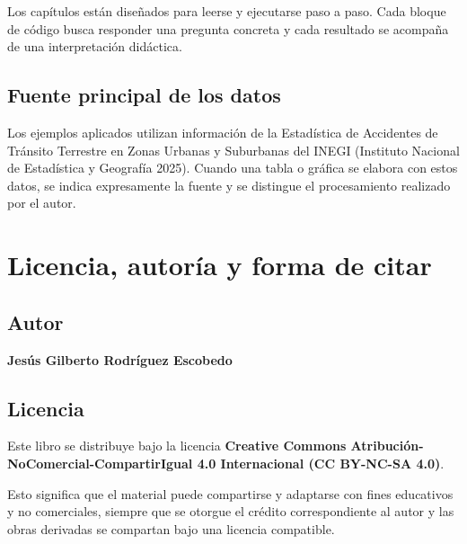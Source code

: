 \documentclass[
  spanish,
  10.5pt,
  letterpaper,
  openany,
  headings=big]{scrbook}
\begin{document}

Los capítulos están diseñados para leerse y ejecutarse paso a paso. Cada
bloque de código busca responder una pregunta concreta y cada resultado
se acompaña de una interpretación didáctica.

\section*{Fuente principal de los
datos}\label{fuente-principal-de-los-datos}


Los ejemplos aplicados utilizan información de la Estadística de
Accidentes de Tránsito Terrestre en Zonas Urbanas y Suburbanas del INEGI
(Instituto Nacional de Estadística y Geografía 2025). Cuando una tabla o
gráfica se elabora con estos datos, se indica expresamente la fuente y
se distingue el procesamiento realizado por el autor.


\chapter*{Licencia, autoría y forma de
citar}\label{licencia-autoruxeda-y-forma-de-citar}


\section*{Autor}\label{autor}


\textbf{Jesús Gilberto Rodríguez Escobedo}

\section*{Licencia}\label{licencia}


Este libro se distribuye bajo la licencia \textbf{Creative Commons
Atribución-NoComercial-CompartirIgual 4.0 Internacional (CC BY-NC-SA
4.0)}.

Esto significa que el material puede compartirse y adaptarse con fines
educativos y no comerciales, siempre que se otorgue el crédito
correspondiente al autor y las obras derivadas se compartan bajo una
licencia compatible.
\end{document}
